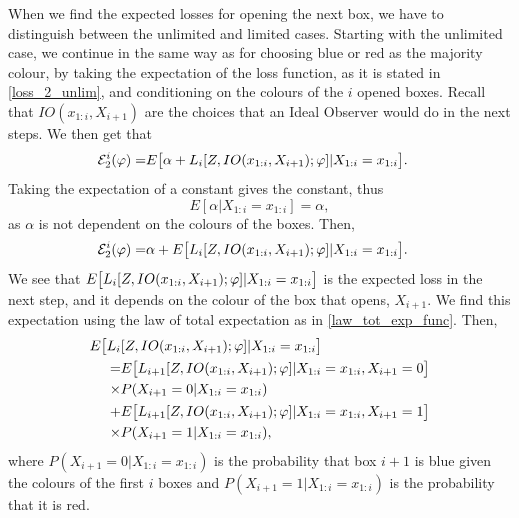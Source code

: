 When we find the expected losses for opening the next box, we have to distinguish between the unlimited and limited cases. Starting with the unlimited case, we continue in the same way as for choosing blue or red as the majority colour, by taking the expectation of the loss function, as it is stated in \eqref{loss_2_unlim}, and conditioning on the colours of the $i$ opened boxes. Recall that $IO(x_{1:i},X_{i+1})$ are the choices that an Ideal Observer would do in the next steps. We then get that
\begin{equation*}
    \begin{aligned}
        \mathcal{E}^i_{2}(\varphi) 
        =& E \big[ \alpha + L_i[Z,IO(x_{1:i},X_{i+1});\varphi] |X_{1:i}=x_{1:i}\big].
    \end{aligned}
\end{equation*}
Taking the expectation of a constant gives the constant, thus
\begin{equation*}
    E[\alpha|X_{1:i}=x_{1:i}]=\alpha,
\end{equation*}
as $\alpha$ is not dependent on the colours of the boxes. Then,
\begin{equation}
\label{exp_loss_unlim_2_unfinished}
    \begin{aligned}
        \mathcal{E}^i_{2}(\varphi) 
        =& \alpha + E \big[L_i[Z,IO(x_{1:i},X_{i+1});\varphi] |X_{1:i}=x_{1:i}\big].
    \end{aligned}
\end{equation}
We see that $E \big[L_i[Z,IO(x_{1:i},X_{i+1});\varphi] |X_{1:i}=x_{1:i}\big]$ is the expected loss in the next step, and it depends on the colour of the box that opens, $X_{i+1}$. We find this expectation using the law of total expectation as in \eqref{law_tot_exp_func}. Then,
\begin{equation}
\label{exp_loss_next_unlim}
    \begin{aligned}
        E \big[L_i&[Z,IO(x_{1:i},X_{i+1});\varphi] |X_{1:i}=x_{1:i}\big] \\
        =& E \big[L_{i+1}[Z,IO(x_{1:i},X_{i+1});\varphi] |X_{1:i}=x_{1:i},X_{i+1}=0\big]\\
        \times& P(X_{i+1}=0|X_{1:i}=x_{1:i}) \\
        +& E \big[L_{i+1}[Z,IO(x_{1:i},X_{i+1});\varphi] |X_{1:i}=x_{1:i},X_{i+1}=1\big]\\
        \times & P(X_{i+1}=1|X_{1:i}=x_{1:i}),
    \end{aligned}
\end{equation}
where $P(X_{i+1}=0|X_{1:i}=x_{1:i})$ is the probability that box $i+1$ is blue given the colours of the first $i$ boxes and $P(X_{i+1}=1|X_{1:i}=x_{1:i})$ is the probability that it is red.  

